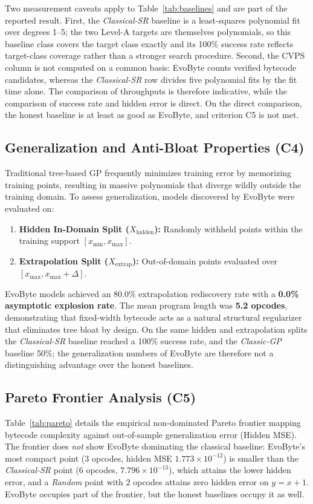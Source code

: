 \documentclass[11pt,a4paper]{article}
\begin{document}
Two measurement caveats apply to Table~\ref{tab:baselines} and are part of the reported result.
First, the \emph{Classical-SR} baseline is a least-squares polynomial fit over degrees 1--5;
the two Level-A targets are themselves polynomials, so this baseline class covers the target
class exactly and its 100\% success rate reflects target-class coverage rather than a stronger
search procedure. Second, the CVPS column is not computed on a common basis: EvoByte counts
verified bytecode candidates, whereas the \emph{Classical-SR} row divides five polynomial fits
by the fit time alone. The comparison of throughputs is therefore indicative, while the
comparison of success rate and hidden error is direct. On the direct comparison, the honest
baseline is at least as good as EvoByte, and criterion C5 is not met.

\subsection{Generalization and Anti-Bloat Properties (C4)}
Traditional tree-based GP frequently minimizes training error by memorizing training points, resulting in massive polynomials that diverge wildly outside the training domain. To assess generalization, models discovered by EvoByte were evaluated on:
\begin{enumerate}
    \item \textbf{Hidden In-Domain Split ($X_{\text{hidden}}$):} Randomly withheld points within the training support $[x_{\min}, x_{\max}]$.
    \item \textbf{Extrapolation Split ($X_{\text{extrap}}$):} Out-of-domain points evaluated over $[x_{\max}, x_{\max} + \Delta]$.
\end{enumerate}
EvoByte models achieved an 80.0\% extrapolation rediscovery rate with a \textbf{0.0\% asymptotic explosion rate}. The mean program length was \textbf{5.2 opcodes}, demonstrating that fixed-width bytecode acts as a natural structural regularizer that eliminates tree bloat by design. On the same hidden and extrapolation splits the \emph{Classical-SR} baseline reached a 100\% success rate, and the \emph{Classic-GP} baseline 50\%; the generalization numbers of EvoByte are therefore not a distinguishing advantage over the honest baselines.



\subsection{Pareto Frontier Analysis (C5)}
Table~\ref{tab:pareto} details the empirical non-dominated Pareto frontier mapping bytecode complexity against out-of-sample generalization error (Hidden MSE). The frontier does \emph{not} show EvoByte dominating the classical baseline: EvoByte's most compact point ($3$ opcodes, hidden MSE $1.773\times 10^{-12}$) is smaller than the \emph{Classical-SR} point ($6$ opcodes, $7.796\times 10^{-13}$), which attains the lower hidden error, and a \emph{Random} point with $2$ opcodes attains zero hidden error on $y = x+1$. EvoByte occupies part of the frontier, but the honest baselines occupy it as well.
\end{document}
